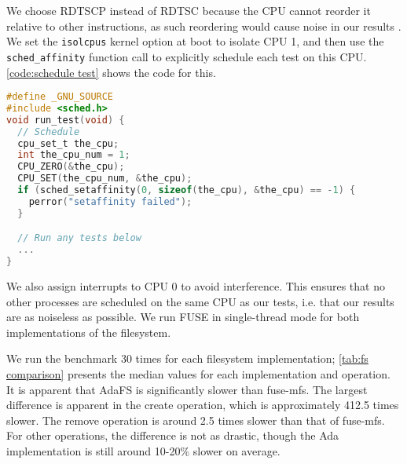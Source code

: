 We choose RDTSCP instead of RDTSC because the CPU cannot reorder it relative to other instructions, as such reordering would cause noise in our results \cite{delorie2016}.
We set the \lstinline{isolcpus} kernel option at boot to isolate CPU 1, and then use the \lstinline{sched_affinity} function call to explicitly schedule each test on this CPU.
\autoref{code:schedule test} shows the code for this.

\begin{lstlisting}[float=tb,caption={Schedule a test on CPU 1}, label={code:schedule test}, language=C]
#define _GNU_SOURCE
#include <sched.h>
void run_test(void) {
  // Schedule
  cpu_set_t the_cpu;
  int the_cpu_num = 1;
  CPU_ZERO(&the_cpu);
  CPU_SET(the_cpu_num, &the_cpu);
  if (sched_setaffinity(0, sizeof(the_cpu), &the_cpu) == -1) {
    perror("setaffinity failed");
  }

  // Run any tests below
  ...
}
\end{lstlisting}

We also assign interrupts to CPU 0 to avoid interference.
This ensures that no other processes are scheduled on the same CPU as our tests, i.e. that our results are as noiseless as possible.
We run FUSE in single-thread mode for both implementations of the filesystem.

We run the benchmark 30 times for each filesystem implementation; \autoref{tab:fs comparison} presents the median values for each implementation and operation.
It is apparent that AdaFS is significantly slower than fuse-mfs.
The largest difference is apparent in the create operation, which is approximately 412.5 times slower.
The remove operation is around 2.5 times slower than that of fuse-mfs.
For other operations, the difference is not as drastic, though the Ada implementation is still around 10-20\% slower on average.

